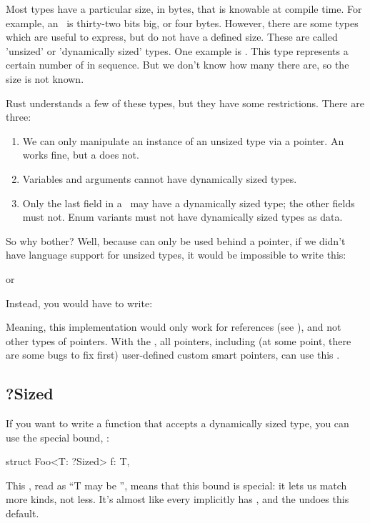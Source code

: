 Most types have a particular size, in bytes, that is knowable at compile time. For example, an \itt\ is thirty-two bits big, or four bytes. 
However, there are some types which are useful to express, but do not have a defined size. These are called 'unsized' or 'dynamically sized' 
types. One example is \code{[T]}. This type represents a certain number of  in sequence. But we don't know how many there are, so 
the size is not known.

\blank

Rust understands a few of these types, but they have some restrictions. There are three:

\begin{enumerate}
  \item{We can only manipulate an instance of an unsized type via a pointer. An \code{\&[T]} works fine, but a \code{[T]} does not.}
  \item{Variables and arguments cannot have dynamically sized types.}
  \item{Only the last field in a \struct\ may have a dynamically sized type; the other fields must not. Enum variants must not have 
      dynamically sized types as data.}
\end{enumerate}

So why bother? Well, because \code{[T]} can only be used behind a pointer, if we didn't have language support for unsized types, 
it would be impossible to write this:

\begin{rustc}
impl Foo for str {
\end{rustc}

or

\begin{rustc}
impl<T> Foo for [T] {
\end{rustc}

Instead, you would have to write:

\begin{rustc}
impl Foo for &str {
\end{rustc}

Meaning, this implementation would only work for references (see ), and not other types of pointers. 
With the , all pointers, including (at some point, there are some bugs to fix first) user-defined custom smart pointers, 
can use this .

\subsection*{?Sized}

If you want to write a function that accepts a dynamically sized type, you can use the special bound, :

\begin{rustc}
struct Foo<T: ?Sized> {
    f: T,
}
\end{rustc}

This , read as \enquote{T may be }, means that this bound is special: it lets us match more kinds, not less. It's almost 
like every  implicitly has , and the  undoes this default.
